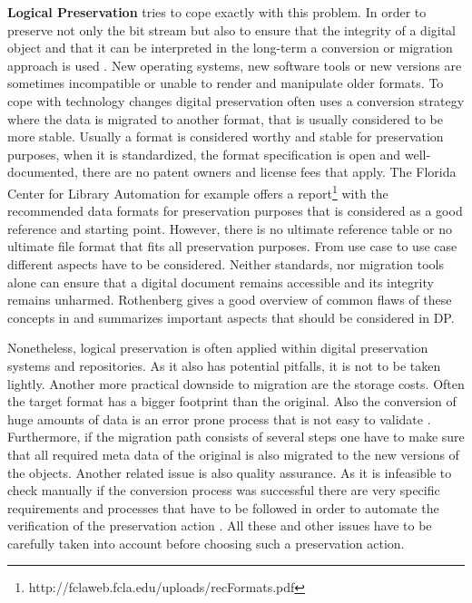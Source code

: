 \textbf{Logical Preservation} tries to cope exactly with this problem. In order to preserve not only the bit stream but also to ensure that the integrity of a digital object and that it can be interpreted in the long-term a conversion or migration approach is used \cite{Lee:2002:SOTADP}. New operating systems, new software tools or new versions are sometimes incompatible or unable to render and manipulate older formats. To cope with technology changes digital preservation often uses a conversion strategy where the data is migrated to another format, that is usually considered to be more stable. Usually a format is considered worthy and stable for preservation purposes, when it is standardized, the format specification is open and well-documented, there are no patent owners and license fees that apply. The Florida Center for Library Automation for example offers a report\footnote{http://fclaweb.fcla.edu/uploads/recFormats.pdf} with the recommended data formats for preservation purposes that is considered as a good reference and starting point. However, there is no ultimate reference table or no ultimate file format that fits all preservation purposes. From use case to use case different aspects have to be considered. Neither standards, nor migration tools alone can ensure that a digital document remains accessible and its integrity remains unharmed. Rothenberg gives a good overview of common flaws of these concepts in \cite{rothenberg:1999:ensuring} and summarizes important aspects that should be considered in DP.

Nonetheless, logical preservation is often applied within digital preservation systems and repositories. As it also has potential pitfalls, it is not to be taken lightly.
Another more practical downside to migration are the storage costs. Often the target format has a bigger footprint than the original. Also the conversion of huge amounts of data is an error prone process that is not easy to validate \cite{Lorie:2001:LTP:379437.379726}. Furthermore, if the migration path consists of several steps one have to make sure that all required meta data of the original is also migrated to the new versions of the objects. Another related issue is also quality assurance. As it is infeasible to check manually if the conversion process was successful there are very specific requirements and processes that have to be followed in order to automate the verification of the preservation action \cite{feng:2010:qrofm}.
All these and other issues have to be carefully taken into account before choosing such a preservation action.
\newline

